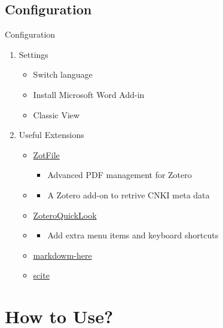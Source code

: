 \documentclass[UTF8]{beamer}
\begin{document}
\subsection{Configuration}
\begin{frame}{Configuration}
\begin{enumerate}
\item Settings
  \begin{itemize}
  \item Switch language
  \item Install Microsoft Word Add-in
  \item Classic View
  \end{itemize}
  
\item Useful Extensions

  \begin{itemize}
  \item  \href{http://zotfile.com/}{\color{blue}ZotFile}
    \begin{itemize}
    \item Advanced PDF management for Zotero
    \end{itemize}
   \item \href{https://github.com/l0o0/jasminum}{\color{blue}{Jasminum}}
   \begin{itemize}
   \item A Zotero add-on to retrive CNKI meta data
   \end{itemize}
  \item \href{https://github.com/mronkko/ZoteroQuickLook/releases}{\color{blue}ZoteroQuickLook}
  \item \href{https://github.com/wshanks/Zutilo}{\color{blue}{Zutilo}}
  \begin{itemize}
  \item Add extra menu items and keyboard shortcuts
  \end{itemize}
  \item \href{https://github.com/fei0810/markdownhere4zotero}{\color{blue}markdowm-here}
 \item \href{https://github.com/scitedotai/scite-zotero-plugin}{\color{blue}scite}
  \end{itemize}
\end{enumerate}
\end{frame}


\section{How to Use?}
\end{document}
